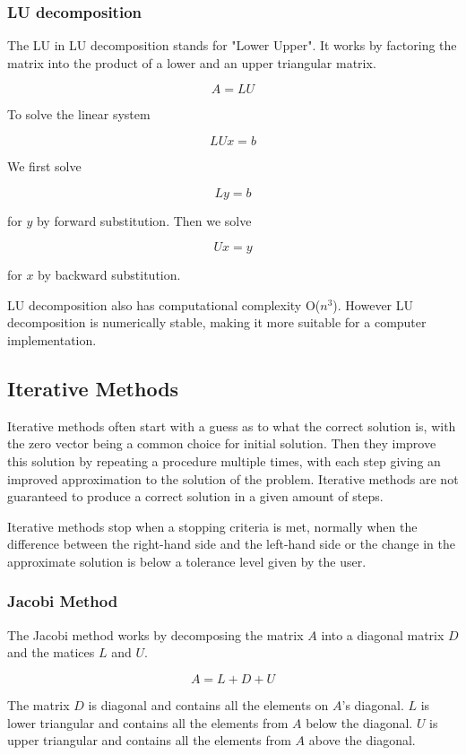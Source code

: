 \subsubsection*{LU decomposition}

The LU in LU decomposition stands for "Lower Upper". It works by factoring the 
matrix into the product of a lower and an upper triangular matrix. 

$$A = LU$$

To solve the linear system 

$$LUx = b$$

We first solve 

$$Ly = b$$

for $y$ by forward substitution. Then we solve 

$$Ux = y$$

for $x$ by backward substitution.

LU decomposition also has computational complexity O($n^3$). However LU decomposition 
is numerically stable, making it more suitable for a computer implementation.

\subsection*{Iterative Methods}

Iterative methods often start with a guess as to what the correct solution is, 
with the zero vector being a common choice for initial solution. Then they improve 
this solution by repeating a procedure multiple times, with each step 
giving an improved approximation to the solution of the problem. Iterative methods 
are not guaranteed to produce a correct solution in a given amount of steps. 

Iterative methods stop when a stopping criteria is met, normally when the difference 
between the right-hand side and the left-hand side or the change in the approximate 
solution is below a tolerance level given by the user. 

\subsubsection*{Jacobi Method}

The Jacobi method works by decomposing the matrix $A$ into a diagonal matrix $D$ 
and the matices $L$ and $U$. 

$$A = L+D+U$$

The matrix $D$ is diagonal and contains all the elements on $A$'s diagonal. $L$ is lower triangular and contains all the elements from $A$ below the diagonal. $U$ is upper triangular and contains all the elements from $A$ above the diagonal.


